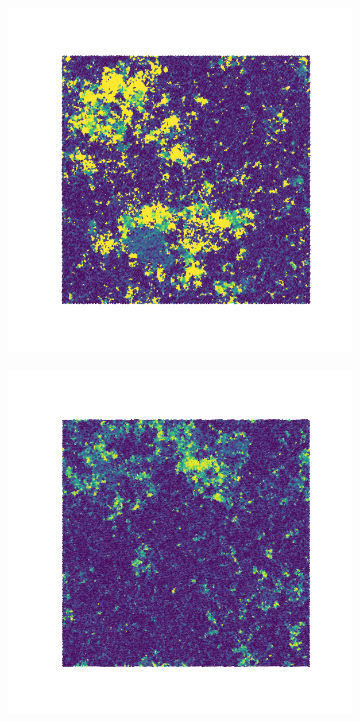 \documentclass[a4paper]{article}
\begin{document}
\begin{figure}[ht]
\begin{subfigure}[ht]{.33\textwidth}
	\end{subfigure}\hfil
	\begin{subfigure}[ht]{.33\textwidth}
		\includegraphics[width=1\columnwidth]{708_-1.png}
	\end{subfigure}
	\medskip
	\begin{subfigure}[ht]{.33\textwidth}
		\includegraphics[width=1\columnwidth]{712_-1.png}

\end{subfigure}
\end{figure}
\end{document}
